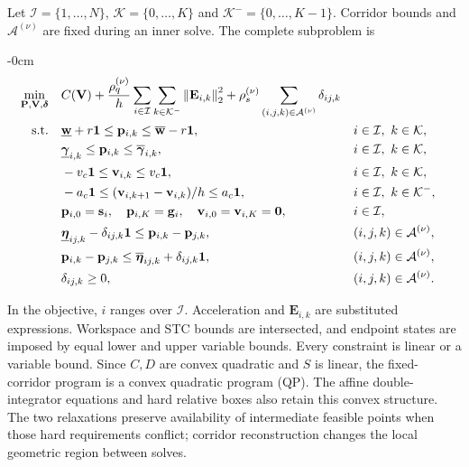 Let $\mathcal I=\{1,\ldots,N\}$, $\mathcal K=\{0,\ldots,K\}$ and $\mathcal K^-=\{0,\ldots,K-1\}$. Corridor bounds and $\mathcal A^{(\nu)}$ are fixed during an inner solve. The complete subproblem is
\begin{adjustwidth}{-\extralength}{0cm}
\begin{subequations}\label{eq:subproblem}\begin{align}
 \min_{\mathbf P,\mathbf V,\boldsymbol\delta}\quad&
 C(\mathbf V)
 +\frac{\rho_q^{(\nu)}}h\sum_{i\in\mathcal I}\sum_{k\in\mathcal K^-}\left\lVert \mathbf E_{i,k}\right\rVert_2^2
 +\rho_s^{(\nu)}\sum_{(i,j,k)\in\mathcal A^{(\nu)}}\delta_{ij,k}
 \label{eq:nlpobjective}\\
 \mathrm{s.t.}\quad&
 \underline{\mathbf w}+r\mathbf{1}\leq\mathbf{p}_{i,k}\leq\overline{\mathbf w}-r\mathbf{1},
 && i\in\mathcal I,\ k\in\mathcal K,\label{eq:nlpworkspace}\\
 &\underline{\boldsymbol\gamma}_{i,k}\leq\mathbf{p}_{i,k}\leq\overline{\boldsymbol\gamma}_{i,k},
 &&i\in\mathcal I,\ k\in\mathcal K,\label{eq:nlpstc}\\
 &-v_c\mathbf{1}\leq\mathbf{v}_{i,k}\leq v_c\mathbf{1},
 &&i\in\mathcal I,\ k\in\mathcal K,\label{eq:nlpvelocity}\\
 &-a_c\mathbf{1}\leq(\mathbf{v}_{i,k+1}-\mathbf{v}_{i,k})/h\leq a_c\mathbf{1},
 &&i\in\mathcal I,\ k\in\mathcal K^-,\label{eq:nlpacceleration}\\
 &\mathbf{p}_{i,0}=\mathbf s_i,\quad\mathbf{p}_{i,K}=\mathbf g_i,\quad
 \mathbf{v}_{i,0}=\mathbf{v}_{i,K}=\mathbf0,
 &&i\in\mathcal I,\label{eq:nlpboundary}\\
 &\underline{\boldsymbol\eta}_{ij,k}-\delta_{ij,k}\mathbf{1}
 \leq\mathbf{p}_{i,k}-\mathbf{p}_{j,k},
 &&(i,j,k)\in\mathcal A^{(\nu)},\label{eq:nlprellower}\\
 &\mathbf{p}_{i,k}-\mathbf{p}_{j,k}\leq\overline{\boldsymbol\eta}_{ij,k}+\delta_{ij,k}\mathbf{1},
 &&(i,j,k)\in\mathcal A^{(\nu)},\label{eq:nlprelupper}\\
 &\delta_{ij,k}\geq0,
 &&(i,j,k)\in\mathcal A^{(\nu)}.\label{eq:nlpslack}
\end{align}\end{subequations}
\end{adjustwidth}
In the objective, $i$ ranges over $\mathcal I$. Acceleration and $\mathbf E_{i,k}$ are substituted expressions. Workspace and STC bounds are intersected, and endpoint states are imposed by equal lower and upper variable bounds. Every constraint is linear or a variable bound. Since $C,D$ are convex quadratic and $S$ is linear, the fixed-corridor program is a convex quadratic program (QP). The affine double-integrator equations and hard relative boxes also retain this convex structure. The two relaxations preserve availability of intermediate feasible points when those hard requirements conflict; corridor reconstruction changes the local geometric region between solves.

